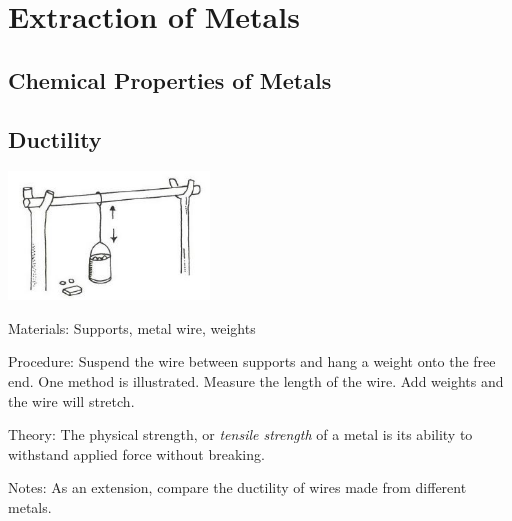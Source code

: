 \section{Extraction of Metals} 

\begin{multicols}{2}


\section*{Chemical Properties of Metals} 


\subsection{Ductility} 

\begin{center}
\includegraphics[width=0.4\textwidth]{./img/vso/ductility.jpg}
\end{center}

\begin{description*}
\item[Materials:]{Supports, metal wire, weights}
\item[Procedure:]{Suspend the wire between
supports and hang a weight onto
the free end. One method is
illustrated. Measure the length of
the wire. Add weights and the
wire will stretch.}
\item[Theory:]{The physical strength, or \emph{tensile strength} of a metal is its ability to withstand applied force without breaking.}
\item[Notes:]{As an extension, compare the
ductility of wires made from
different metals.}
\end{description*}


\end{multicols}
